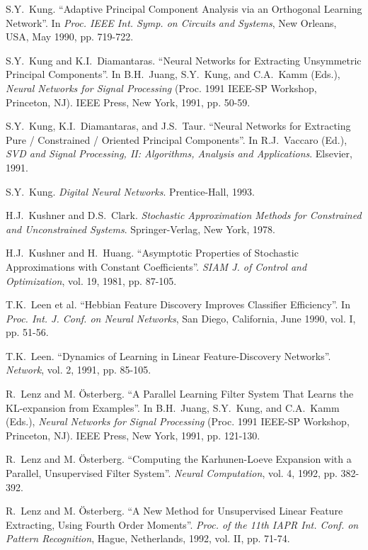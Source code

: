 \begin{thebibliography}{999}
S.Y.~Kung.
``Adaptive Principal Component Analysis via an Orthogonal Learning Network''.
In {\em Proc. IEEE Int. Symp. on Circuits and Systems}, New Orleans, USA,
May 1990, pp. 719-722.
 
S.Y.~Kung and K.I.~Diamantaras.
``Neural Networks for Extracting Unsymmetric Principal Components''.
In B.H.~Juang, S.Y.~Kung, and C.A.~Kamm (Eds.), {\em Neural
Networks for Signal Processing} (Proc. 1991 IEEE-SP Workshop, Princeton,
NJ). IEEE Press, New York, 1991, pp. 50-59.
 
S.Y.~Kung, K.I.~Diamantaras, and J.S.~Taur.
``Neural Networks for Extracting Pure / Constrained / Oriented
Principal Components''.
In R.J.~Vaccaro (Ed.), {\em SVD and Signal Processing, II: Algorithms,
Analysis and Applications}. Elsevier, 1991.
 
S.Y.~Kung.
{\em Digital Neural Networks}. Prentice-Hall, 1993.

H.J.~Kushner and D.S.~Clark.
{\em Stochastic Approximation Methods for Constrained and
Unconstrained Systems}.
Springer-Verlag, New York, 1978.
 
H.J.~Kushner and H.~Huang.
``Asymptotic Properties of Stochastic Approximations with Constant
Coefficients''.
{\em SIAM J. of Control and Optimization}, vol. 19, 1981, pp. 87-105.
 
T.K.~Leen et al.
``Hebbian Feature Discovery Improves Classifier Efficiency''.
In {\em Proc. Int. J. Conf. on Neural Networks}, San Diego, California,
June 1990, vol. I, pp. 51-56.

T.K.~Leen.
``Dynamics of Learning in Linear Feature-Discovery Networks''.
{\em Network}, vol. 2, 1991, pp. 85-105.

R.~Lenz and M. \"Osterberg.
``A Parallel Learning Filter System That Learns the KL-expansion
from Examples''.
In B.H.~Juang, S.Y.~Kung, and C.A.~Kamm (Eds.), {\em Neural
Networks for Signal Processing} (Proc. 1991 IEEE-SP Workshop, Princeton,
NJ). IEEE Press, New York, 1991, pp. 121-130. 

R.~Lenz and M. \"Osterberg.
``Computing the Karhunen-Loeve Expansion with a Parallel, Unsupervised
Filter System''.
{\em Neural Computation}, vol. 4, 1992, pp. 382-392.

R.~Lenz and M. \"Osterberg.
``A New Method for Unsupervised Linear Feature Extracting, Using
Fourth Order Moments''.
{\em Proc. of the 11th IAPR Int. Conf. on Pattern Recognition},
Hague, Netherlands, 1992, vol. II, pp. 71-74.


\end{thebibliography}
